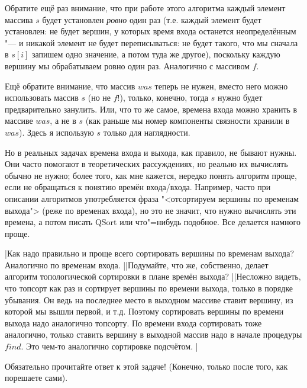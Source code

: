 Обратите ещё раз внимание, что при работе этого 
алгоритма каждый элемент массива $s$ будет установлен \textit{ровно} один раз (т.е. каждый элемент будет установлен:
не будет вершин, у которых время входа останется неопределённым "--- и никакой элемент не будет переписываться:
не будет такого, что мы сначала в $s[i]$ запишем одно значение, а потом туда же другое), поскольку
каждую вершину мы обрабатываем ровно один раз. Аналогично с массивом $f$.

Ещё обратите внимание, что массив $was$ теперь не нужен, вместо него можно использовать массив $s$ (но не $f$!),
только, конечно, тогда $s$ нужно будет предварительно занулить. Или, что то же самое, времена входа можно хранить 
в массиве $was$, а не в $s$ (как раньше мы номер компоненты связности хранили в $was$). Здесь я использую
$s$ только для наглядности.

Но в реальных задачах времена входа и выхода, как правило, не бывают нужны. Они часто помогают в теоретических 
рассуждениях, но реально их вычислять обычно не нужно; более того, как мне кажется, нередко понять алгоритм проще, если 
не обращаться к понятию времён входа/входа. Например, часто при описании алгоритмов употребляется фраза 
"<отсортируем вершины по временам выхода"> (реже по временах входа), но это не значит, что нужно вычислять эти 
времена, а потом писать QSort или что"=нибудь подобное. Все делается намного проще.
                      
\task|Как надо правильно и проще всего сортировать вершины по временам выхода? Аналогично по временам входа.
||Подумайте, что же, собственно, делает алгоритм топологической сортировки в плане времён выхода?
||Несложно видеть, что топсорт как раз и сортирует вершины по времени выхода, только
в порядке убывания. Он ведь на последнее место в выходном массиве ставит вершину, из которой мы вышли первой, 
и т.д. Поэтому сортировать вершины по времени выхода надо аналогично топсорту. По времени входа сортировать
тоже аналогично, только ставить вершину в выходной массив надо в начале процедуры $find$. Это чем-то аналогично
сортировке подсчётом.
|\label{howtosort}

Обязательно прочитайте ответ к этой задаче! (Конечно, только после того, как порешаете сами).
